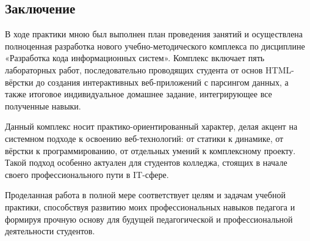 \subsection*{Заключение}

В ходе практики мною был выполнен план проведения занятий и осуществлена полноценная разработка нового учебно-методического комплекса по дисциплине «Разработка кода информационных систем». Комплекс включает пять лабораторных работ, последовательно проводящих студента от основ HTML-вёрстки до создания интерактивных веб-приложений с парсингом данных, а также итоговое индивидуальное домашнее задание, интегрирующее все полученные навыки.

Данный комплекс носит практико-ориентированный характер, делая акцент на системном подходе к освоению веб-технологий: от статики к динамике, от вёрстки к программированию, от отдельных умений к комплексному проекту. Такой подход особенно актуален для студентов колледжа, стоящих в начале своего профессионального пути в IT-сфере.

Проделанная работа в полной мере соответствует целям и задачам учебной практики, способствуя развитию моих профессиональных навыков педагога и формируя прочную основу для будущей педагогической и профессиональной деятельности студентов.

\newpage
\renewcommand{\refname}{Список использованных источников}

